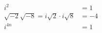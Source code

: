 \documentclass[preview]{standalone}
\begin{document}
\begin{align*}
i^2 &= 1 \\ \sqrt{-2}\sqrt{-8} = i\sqrt{2} \cdot i\sqrt{8} &= -4 \\ i^{4n} &= 1
\end{align*}
\end{document}
